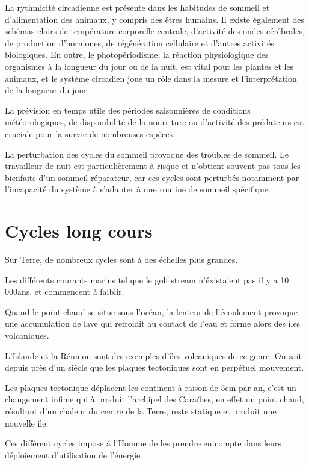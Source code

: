 La rythmicité circadienne est présente dans les habitudes de sommeil et
d'alimentation des animaux, y compris des êtres humains. Il existe également
des schémas clairs de température corporelle centrale, d'activité des ondes cérébrales,
de production d'hormones, de régénération cellulaire et d'autres activités biologiques.
En outre, le photopériodisme, la réaction physiologique des organismes à la longueur du
jour ou de la nuit, est vital pour les plantes et les animaux, et le système circadien
joue un rôle dans la mesure et l'interprétation de la longueur du jour.

La prévision en temps utile des périodes saisonnières de conditions météorologiques,
de disponibilité de la nourriture ou d'activité des prédateurs est cruciale pour
la survie de nombreuses espèces.

La perturbation des cycles du sommeil provoque des troubles de sommeil.
Le travailleur de nuit est particulièrement à risque et n’obtient souvent
pas tous les bienfaits d’un sommeil réparateur, car ces cycles sont perturbés
notamment par l’incapacité du système à s’adapter à une routine de sommeil spécifique.

\section{Cycles long cours}

Sur Terre, de nombreux cycles sont à des échelles plus grandes.

Les différents courants marins tel que le golf stream n'éxistaient pas il y a 10 000ans, et commencent à faiblir.

Quand le point chaud se situe sous l'océan, la lenteur de l'écoulement provoque une accumulation de
lave qui refroidit au contact de l'eau et forme alors des îles volcaniques.

L'Islande et la Réunion sont des exemples d'îles volcaniques de ce genre.
On sait depuis près d'un siècle que les plaques tectoniques sont en perpétuel mouvement.

Les plaques tectonique déplacent les continent à raison de 5cm par an, c'est un changement infime
qui à produit l'archipel des Caraïbes, en effet un point chaud, résultant d'un chaleur du centre de la Terre,
reste statique et produit une nouvelle ile.

Ces différent cycles impose à l'Homme de les prendre en compte dans leurs déploiement d'utilisation de l'énergie.

